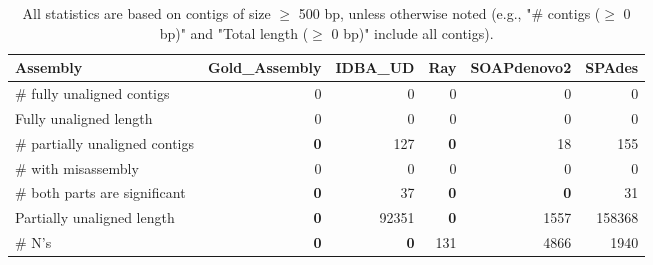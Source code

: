 \documentclass[12pt,a4paper]{article}
\begin{document}
\begin{table}[ht]
\begin{center}
\caption{All statistics are based on contigs of size $\geq$ 500 bp, unless otherwise noted (e.g., "\# contigs ($\geq$ 0 bp)" and "Total length ($\geq$ 0 bp)" include all contigs).}
\begin{tabular}{|l*{5}{|r}|}
\hline
Assembly & Gold\_Assembly & IDBA\_UD & Ray & SOAPdenovo2 & SPAdes \\ \hline
\# fully unaligned contigs & 0 & 0 & 0 & 0 & 0 \\ \hline
Fully unaligned length & 0 & 0 & 0 & 0 & 0 \\ \hline
\# partially unaligned contigs & {\bf 0} & 127 & {\bf 0} & 18 & 155 \\ \hline
\hspace{5mm}\# with misassembly & 0 & 0 & 0 & 0 & 0 \\ \hline
\hspace{5mm}\# both parts are significant & {\bf 0} & 37 & {\bf 0} & {\bf 0} & 31 \\ \hline
Partially unaligned length & {\bf 0} & 92351 & {\bf 0} & 1557 & 158368 \\ \hline
\# N's & {\bf 0} & {\bf 0} & 131 & 4866 & 1940 \\ \hline
\end{tabular}
\end{center}
\end{table}
\end{document}
